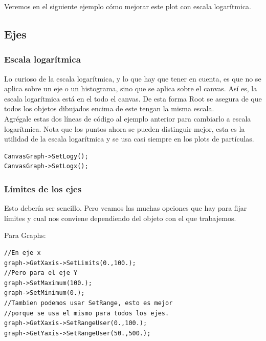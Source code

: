 \documentclass{article}
\begin{document}
Veremos en el siguiente ejemplo c\'omo mejorar este plot con escala logar\'itmica.

\subsection{Ejes}

\subsubsection{Escala logar\'itmica}

Lo curioso de la escala logar\'itmica, y lo que hay que tener en cuenta, es que no se aplica sobre un eje o un histograma, sino que se aplica sobre el canvas. As\'i es, la escala logar\'itmica est\'a en el todo el canvas. De esta forma Root se asegura de que todos los objetos dibujados encima de este tengan la misma escala.\\
Agr\'egale estas dos l\'ineas de c\'odigo al ejemplo anterior para cambiarlo a escala logar\'itmica. Nota que los puntos ahora se pueden distinguir mejor, esta es la utilidad de la escala logar\'itmica y se usa casi siempre en los plots de part\'iculas.

\begin{tcolorbox} [breakable]
\begin{verbatim}
CanvasGraph->SetLogy();
CanvasGraph->SetLogx();
\end{verbatim}
\end{tcolorbox}

\subsubsection{L\'imites de los ejes}

Esto deber\'ia ser sencillo. Pero veamos las muchas opciones que hay para fijar l\'imites y cual nos conviene dependiendo del objeto con el que trabajemos.

Para Graphs:

\begin{tcolorbox} [breakable]
\begin{verbatim}
//En eje x
graph->GetXaxis->SetLimits(0.,100.);
//Pero para el eje Y
graph->SetMaximum(100.);
graph->SetMinimum(0.);
//Tambien podemos usar SetRange, esto es mejor
//porque se usa el mismo para todos los ejes.
graph->GetXaxis->SetRangeUser(0.,100.);
graph->GetYaxis->SetRangeUser(50.,500.);
\end{verbatim}
\end{tcolorbox}
\end{document}
